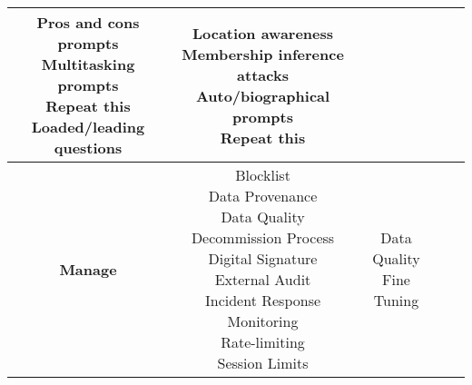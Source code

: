 \documentclass[fleqn]{article}
\begin{document}
\begin{landscape}
\begin{table}[H]
\begin{tabular}{|c|c|c|c|c|}
{			\textbullet\hspace{3pt} Pros and cons prompts \\
			\textbullet\hspace{3pt} Multitasking prompts \\ 
			\textbullet\hspace{3pt} Repeat this \\ 
			\textbullet\hspace{3pt} Loaded/leading questions \\ 
		}   
		& \makecell[l]{
			\textbullet\hspace{3pt} Location awareness \\ 
			\textbullet\hspace{3pt} Membership inference attacks \\ 
			\textbullet\hspace{3pt} Auto/biographical prompts \\ 
			\textbullet\hspace{3pt} Repeat this \\
		}
		\\
		\hline
		\textbf{Manage} & \makecell[l]{
			\textbullet\hspace{3pt} Blocklist \\
			\textbullet\hspace{3pt} Data Provenance\\
			\textbullet\hspace{3pt} Data Quality\\  	 
			\textbullet\hspace{3pt} Decommission Process\\ 
			\textbullet\hspace{3pt} Digital Signature\\ 	
			\textbullet\hspace{3pt} External Audit\\ 
			\textbullet\hspace{3pt} Incident Response\\ 
			\textbullet\hspace{3pt} Monitoring\\ 	
			\textbullet\hspace{3pt} Rate-limiting \\ 	
			\textbullet\hspace{3pt} Session Limits\\ 						 	 
		} 
		& \makecell[l]{
			\textbullet\hspace{3pt} Data Quality\\ 
			\textbullet\hspace{3pt} Fine Tuning\\ 	
}
\end{tabular}
\end{table}
\end{landscape}
\end{document}
